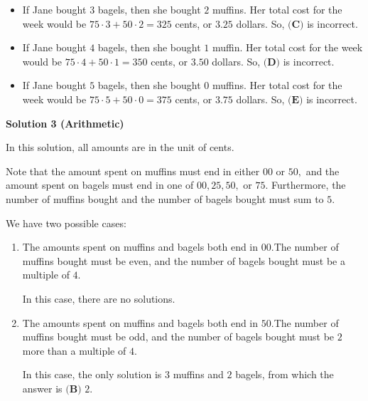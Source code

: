 \begin{enumerate}
 
            \begin{itemize}
        \item If Jane bought $3$ bagels, then she bought $2$ muffins. Her total cost for the week would be $75\cdot3+50\cdot2=325$ cents, or $3.25$ dollars. So, $\textbf{(C)}$ is incorrect.
            \end{itemize}
            
            \begin{itemize}
        \item If Jane bought $4$ bagels, then she bought $1$ muffin. Her total cost for the week would be $75\cdot4+50\cdot1=350$ cents, or $3.50$ dollars. So, $\textbf{(D)}$ is incorrect.
            \end{itemize}
            
            \begin{itemize}
        \item If Jane bought $5$ bagels, then she bought $0$ muffins. Her total cost for the week would be $75\cdot5+50\cdot0=375$ cents, or $3.75$ dollars. So, $\textbf{(E)}$ is incorrect.
            \end{itemize}
            



\textbf{Solution 3 (Arithmetic)}

In this solution, all amounts are in the unit of cents.

 Note that the amount spent on muffins must end in either $00$ or $50,$ and the amount spent on bagels must end in one of $00,25,50,$ or $75.$ Furthermore, the number of muffins bought and the number of bagels bought must sum to $5.$

 We have two possible cases:

 
            \begin{enumerate} 
        \item The amounts spent on muffins and bagels both end in $00.$The number of muffins bought must be even, and the number of bagels bought must be a multiple of $4.$ 

 In this case, there are no solutions.  

 
        \item The amounts spent on muffins and bagels both end in $50.$The number of muffins bought must be odd, and the number of bagels bought must be $2$ more than a multiple of $4.$ 

 In this case, the only solution is $3$ muffins and $2$ bagels, from which the answer is $\boxed{\textbf{(B) } 2}.$


\end{enumerate}
\end{enumerate}
